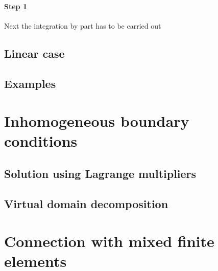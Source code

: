 \paragraph{Step 1} Next the integration by part has to be carried out
\subsection{Linear case}

\subsection{Examples}

\section{Inhomogeneous boundary conditions}\label{sec:mixedbc}

\subsection{Solution using Lagrange multipliers}

\subsection{Virtual domain decomposition}


\section{Connection with mixed finite elements}





